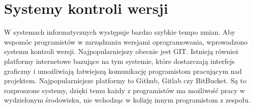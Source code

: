 \chapter{Systemy kontroli wersji}
W systemach informatycznych występuje bardzo szybkie tempo zmian. Aby wspomóc programistów w zarządzaniu wersjami oprogramowania, wprowadzono systemu kontroli wersji. Najpopularniejszy obecnie jest GIT. Istnieją również platformy internetowe bazujące na tym systemie, które dostarczają interfejs graficzny i umożliwiają łatwiejszą komunikację programistom pracującym nad projektem. Najpopularniejsze platformy to Github, Gitlab czy BitBucket. Są to rozproszone systemy, dzięki temu każdy z programistów ma możliwość pracy w wydzielonym środowisku, nie wchodząc w kolizję innym programistom z zespołu.
